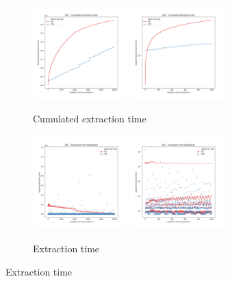 \begin{figure}
    \centering
    \begin{subfigure}[b]{\textwidth}
        \centering
        \includegraphics[width=0.40\textwidth]{./fragments/04_experimental_execution/images/01_basebenchmark_02_sort_a_case.png.0_0.png}
        \includegraphics[width=0.40\textwidth]{./fragments/04_experimental_execution/images/01_basebenchmark_02_sort_a_case.png.0_1.png}
        \caption{Cumulated extraction time}
        \label{FIG:BENCHMARK_02_ASC_CASE__0_0}
    \end{subfigure}

    \begin{subfigure}[b]{\textwidth}
        \centering
        \includegraphics[width=0.40\textwidth]{./fragments/04_experimental_execution/images/01_basebenchmark_02_sort_a_case.png.1_0.png}
        \includegraphics[width=0.40\textwidth]{./fragments/04_experimental_execution/images/01_basebenchmark_02_sort_a_case.png.1_1.png}
        \caption{Extraction time}
        \label{FIG:BENCHMARK_02_ASC_CASE__0_0}
    \end{subfigure}


\end{figure}
